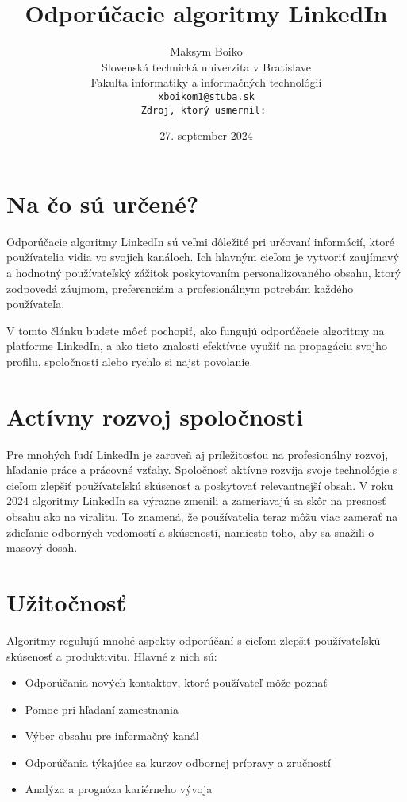 \documentclass[twoside,slovak,a4paper]{coursepaper}
\title{Odporúčacie algoritmy LinkedIn\centering}
\author{Maksym Boiko\\[2pt]
{ Slovenská technická univerzita v Bratislave}\\
{ Fakulta informatiky a informačných technológií}\\
{\texttt{xboikom1@stuba.sk}}\\
{\texttt{Zdroj, ktorý usmernil:~\cite{Oladipo:article}}}
}
\date{\small 27. september 2024}
\begin{document}
\maketitle

\section{Na čo sú určené?}
Odporúčacie algoritmy LinkedIn sú veľmi dôležité pri určovaní informácií, ktoré používatelia vidia vo svojich kanáloch. Ich hlavným cieľom je vytvoriť zaujímavý a hodnotný používateľský zážitok poskytovaním personalizovaného obsahu, ktorý zodpovedá záujmom, preferenciám a profesionálnym potrebám každého používateľa.

V tomto článku budete môcť pochopiť, ako fungujú odporúčacie algoritmy na platforme LinkedIn, a ako tieto znalosti efektívne využiť na propagáciu svojho profilu, spoločnosti alebo rychlo si najst povolanie.~\cite{Gabric:article}

\section{Actívny rozvoj spoločnosti} \label{rozvoj spoločnosti}

Pre mnohých ľudí LinkedIn je zaroveň aj príležitosťou na profesionálny rozvoj, hľadanie práce a prácovné vzťahy.
Spoločnosť aktívne rozvíja svoje technológie s cieľom zlepšiť používateľskú skúsenosť a poskytovať relevantnejší obsah. V roku 2024 algoritmy LinkedIn sa výrazne zmenili a zameriavajú sa skôr na presnosť obsahu ako na viralitu. To znamená, že používatelia teraz môžu viac zamerať na zdieľanie odborných vedomostí a skúseností, namiesto toho, aby sa snažili o masový dosah.~\cite{Oladipo:article}

\section{Užitočnosť} \label{Užitočnosť}
Algoritmy regulujú mnohé aspekty odporúčaní s cieľom zlepšiť používateľskú skúsenosť a produktivitu. Hlavné z nich sú:

\begin{itemize}
	\item Odporúčania nových kontaktov, ktoré používateľ môže poznať
	\item Pomoc pri hľadaní zamestnania
	\item Výber obsahu pre informačný kanál
	\item Odporúčania týkajúce sa kurzov odbornej prípravy a zručností
	\item Analýza a prognóza kariérneho vývoja
  \end{itemize}
\end{document}
